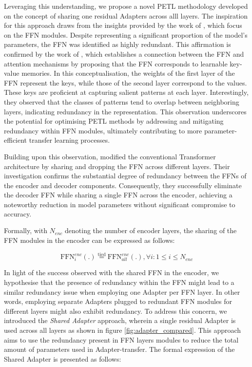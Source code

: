 Leveraging this understanding, we propose a novel PETL methodology developed on the concept of sharing one residual Adapters across alll layers. The inspiration for this approach draws from the insights provided by the work of \cite{pires2023one}, which focus on the FFN modules. Despite representing a significant proportion of the model's parameters, the FFN was identified as highly redundant. This affirmation is confirmed by the work of \cite{geva2020transformer}, which  establishes a connection between the FFN and attention mechanisms by proposing that the FFN corresponds to learnable key-value memories. In this conceptualisation, the weights of the first layer of the FFN represent the keys, while those of the second layer correspond to the values. These keys are proficient at capturing salient patterns at each layer. Interestingly, they observed that the classes of patterns tend to overlap between neighboring layers, indicating redundancy in the representation. This observation underscores the potential for optimising PETL methods by addressing and mitigating redundancy within FFN modules, ultimately contributing to more parameter-efficient transfer learning processes.

Building upon this observation, \cite{pires2023one} modified the conventional Transformer architecture by sharing and dropping the FFN across different layers. Their investigation confirms the substantial degree of redundancy between the FFNs of the encoder and decoder components. Consequently, they successfully eliminate the decoder FFN while sharing a single FFN across the encoder, achieving a noteworthy reduction in model parameters without significant compromise to accuracy.

Formally, with $N_{enc}$ denoting the number of encoder layers, the sharing of the FFN modules in the encoder can be expressed as follows:

\begin{equation}
    \text{FFN}_{i}^{enc}(.) \stackrel{\text{tied}}{=} \text{FFN}^{enc}_{all}(.) , \forall i: 1 \leq i \leq N_{enc}
\end{equation}

In light of the success observed with the shared FFN in the encoder, we hypothesise that the presence of redundancy within the FFN might lead to a similar redundancy issue when employing one Adapter per FFN layer. In other words, employing separate Adapters plugged to redundant FFN modules for different layers might also exhibit redundancy. To address this concern, we introduced the \textit{Shared Adapter} approach, wherein a single residual Adapter is used across all layers as shown in figure \ref{fig:adapter_compared}. This approach aims to use the redundancy present in FFN layers modules to reduce the total amount of parameters used in Adapter-transfer. The formal expression of the Shared Adapter is presented as follows:


